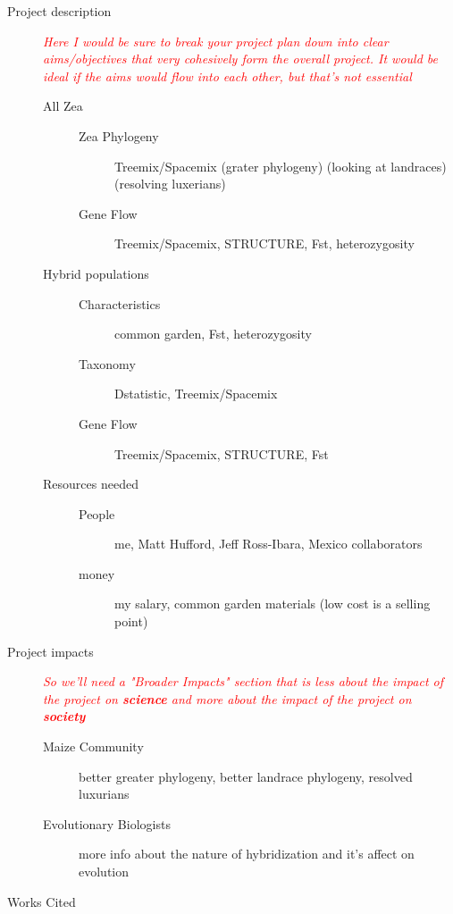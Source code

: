 \documentclass[11pt]{amsart}
\newcommand{\mbh}[1]{\textcolor{red}{ \emph{\scriptsize  #1}} }
\begin{document}
\begin{description}
	\item[Project description] \hfill
	\mbh{Here I would be sure to break your project plan down into clear aims/objectives that very cohesively form the overall project.  It would be ideal if the aims would flow into each other, but that's not essential}
		\begin{description}
			\item[All Zea] \hfill
				\begin{description}
					\item[Zea Phylogeny] Treemix/Spacemix (grater phylogeny) (looking at landraces) (resolving luxerians)
					\item[Gene Flow] Treemix/Spacemix, STRUCTURE, Fst, heterozygosity
				\end{description}
			\item[Hybrid populations] \hfill
				\begin{description}
					\item[Characteristics] common garden, Fst, heterozygosity
					\item[Taxonomy] Dstatistic, Treemix/Spacemix
					\item[Gene Flow] Treemix/Spacemix, STRUCTURE, Fst
				\end{description}
			\item[Resources needed]
				\begin{description}
					\item[People] me, Matt Hufford, Jeff Ross-Ibara, Mexico collaborators
					\item[money] my salary, common garden materials (low cost is a selling point)
				\end{description}
		\end{description}
	\item[Project impacts] \hfill
	\mbh{So we'll need a "Broader Impacts" section that is less about the impact of the project on \textbf{science} and more about the impact of the project on \textbf{society}}
		\begin{description}
			\item[Maize Community] better greater phylogeny, better landrace phylogeny, resolved luxurians
			\item[Evolutionary Biologists] more info about the nature of hybridization and it's affect on evolution
		\end{description}
	\item[Works Cited] 
\end{description}
\end{document}
